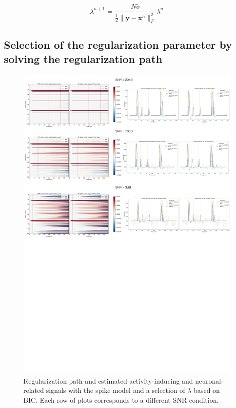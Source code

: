 \begin{equation}
    \lambda^{n+1} = \frac{N \tilde{\sigma}}{\frac{1}{2} \| \mathbf{y} - \mathbf{x}^n \|_F^2} \lambda^n
\end{equation}

\subsection{Selection of the regularization parameter by solving the regularization path}

\begin{figure}[t!]
    \begin{center}
        \includegraphics[width=\textwidth]{figures/regpath_spike.pdf}
    \end{center}
    \caption{Regularization path and estimated activity-inducing and neuronal-related signals with the spike model and a selection of \(\lambda\) based on BIC. Each row of plots corresponds to a different SNR condition.}
\label{fig:path_spike}
\end{figure}

